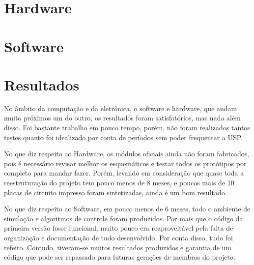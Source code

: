 \documentclass[]{politex}
\begin{document}
\part{Hardware}





\part{Software}







\begin{comment} %



\end{comment}

\part{Resultados}

No âmbito da computação e da eletrônica, o software e hardware, que andam muito próximos um do outro, os resultados foram satisfatórios, mas nada além disso. Foi bastante trabalho em pouco tempo, porém, não foram realizados tantos testes quanto foi idealizado por conta de períodos sem poder frequentar a USP.

No que diz respeito ao Hardware, os módulos oficiais ainda não foram fabricados, pois é necessário revisar melhor os esquemáticos e testar todos os protótipos por completo para mandar fazer. Porém, levando em consideração que quase toda a reestruturação do projeto tem pouco menos de 8 meses, e poucos mais de 10 placas de circuito impresso foram sintetizadas, ainda é um bom resultado.

No que diz respeito ao Software, em pouco menos de 6 meses, todo o ambiente de simulação e algoritmos de controle foram produzidos. Por mais que o código da primeira versão fosse funcional, muito pouco era reaproveitável pela falta de organização e documentação de tudo desenvolvido. Por conta disso, tudo foi refeito. Contudo, tiveram-se muitos resultados produzidos e garantia de um código que pode ser repassado para futuras gerações de membros do projeto.






\apendice


\anexo

\end{document}

